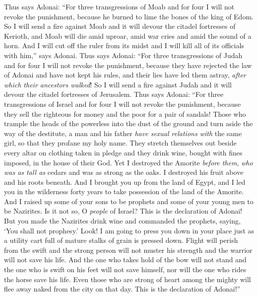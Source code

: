 \begin{biblechapter} %
\verse Thus says Adonai: “For three transgressions of Moab and for four I will not revoke the punishment, because he burned to lime the bones of the king of Edom.
\verse So I will send a fire against Moab and it will devour the citadel fortresses of Kerioth, and Moab will die amid uproar, amid war cries and amid the sound of a horn.
\verse And I will cut off the ruler from its midst and I will kill all of its officials with him,” says Adonai.
 Thus says Adonai: “For three transgressions of Judah and for four I will not revoke the punishment, because they have rejected the law of Adonai and have not kept his rules, and their lies have led them astray, \textit{after which their ancestors walked}!
\verse So I will send a fire against Judah and it will devour the citadel fortresses of Jerusalem.
 Thus says Adonai: “For three transgressions of Israel and for four I will not revoke the punishment, because they sell the righteous for money and the poor for a pair of sandals!
\verse Those who trample the heads of the powerless into the dust of the ground and turn aside the way of the destitute, a man and his father \textit{have sexual relations with} the same girl, so that they profane my holy name.
\verse They stretch themselves out beside every altar on clothing taken in pledge and they drink wine, bought with fines imposed, in the house of their God.
\verse Yet I destroyed the Amorite \textit{before them}, \textit{who was as tall as} cedars and was as strong as the oaks. I destroyed his fruit above and his roots beneath.
\verse And I brought you up from the land of Egypt, and I led you in the wilderness forty years to take possession of the land of the Amorite.
\verse And I raised up some of your sons to be prophets and some of your young men to be Nazirites. Is it not so, O \textit{people} of Israel? This is the declaration of Adonai!
\verse But you made the Nazirites drink wine and commanded the prophets, saying, ‘You shall not prophesy.’
\verse Look! I am going to press you down in your place just as a utility cart full of mature stalks of grain is pressed down.
\verse Flight will perish from the swift and the strong person will not muster his strength and the warrior will not save his life.
\verse And the one who takes hold of the bow will not stand and the one who is swift on his feet will not save himself, nor will the one who rides the horse save his life.
\verse Even those who are strong of heart among the mighty will flee away naked from the city on that day. This is the declaration of Adonai!”
\end{biblechapter}

